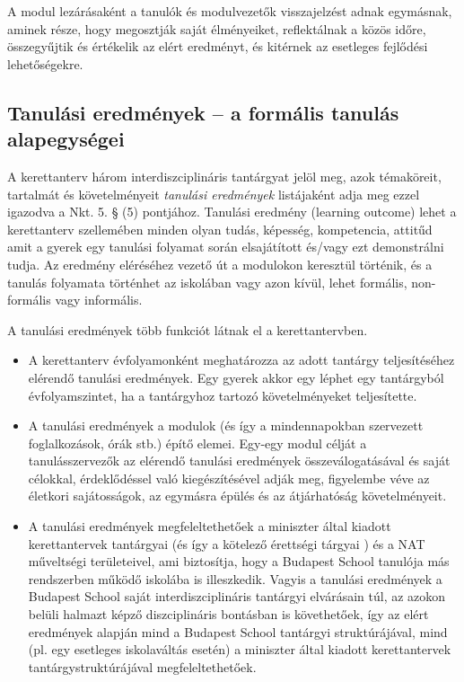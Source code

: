 A modul lezárásaként a tanulók és modulvezetők visszajelzést adnak
egymásnak, aminek része, hogy megosztják saját élményeiket, reflektálnak
a közös időre, összegyűjtik és értékelik az elért eredményt, és kitérnek
az esetleges fejlődési lehetőségekre.

\subsection{Tanulási eredmények -- a formális tanulás alapegységei}
\label{sec:tanulasi_eredmenyek}
A kerettanterv három interdiszciplináris tantárgyat jelöl meg, azok
témaköreit, tartalmát és követelményeit \emph{tanulási eredmények}
listájaként adja meg ezzel igazodva a Nkt. 5. § (5) pontjához. Tanulási
eredmény (learning outcome) lehet a kerettanterv szellemében minden
olyan tudás, képesség, kompetencia, attitűd amit a gyerek egy tanulási
folyamat során elsajátított és/vagy ezt demonstrálni tudja. Az eredmény
eléréséhez vezető út a modulokon keresztül történik, és a tanulás
folyamata történhet az iskolában vagy azon kívül, lehet formális,
non-formális vagy informális.

A tanulási eredmények több funkciót látnak el a kerettantervben.

\begin{itemize}

      \item A kerettanterv évfolyamonként meghatározza az adott tantárgy
            teljesítéséhez elérendő tanulási eredmények. Egy gyerek akkor egy
            léphet
            egy tantárgyból évfolyamszintet, ha a tantárgyhoz tartozó
            követelményeket teljesítette.

      \item A tanulási eredmények a modulok (és így a mindennapokban szervezett
            foglalkozások, órák stb.) építő elemei. Egy-egy modul
            célját a  tanulásszervezők az elérendő tanulási
            eredmények	összeválogatásával és saját célokkal,
            érdeklődéssel való	kiegészítésével adják meg,
            figyelembe véve az életkori  sajátosságok, az egymásra
            épülés és az átjárhatóság  követelményeit.
      \item A tanulási eredmények megfeleltethetőek a miniszter által kiadott
            kerettantervek tantárgyai (és így a kötelező érettségi
            tárgyai )  és a NAT műveltségi területeivel, ami
            biztosítja, hogy a Budapest  School tanulója más
            rendszerben működő iskolába is illeszkedik.  Vagyis a
            tanulási eredmények a Budapest School saját
            interdiszciplináris tantárgyi elvárásain túl, az azokon belüli
            halmazt képző diszciplináris bontásban is követhetőek,
            így az	elért eredmények alapján mind a Budapest School
            tantárgyi  struktúrájával, mind (pl. egy esetleges
            iskolaváltás esetén) a	miniszter által kiadott
            kerettantervek tantárgystruktúrájával
            megfeleltethetőek.
\end{itemize}

